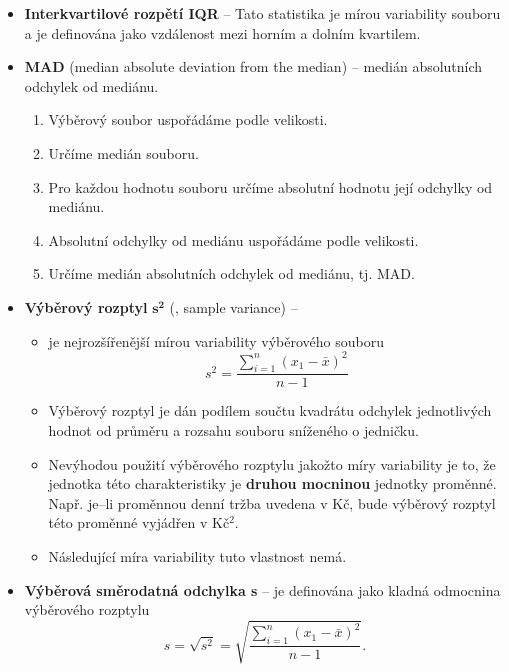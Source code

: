 \begin{itemize}
    \item \textbf{Interkvartilové rozpětí IQR} -- Tato statistika je mírou variability souboru a je definována jako vzdálenost mezi horním a dolním kvartilem.
    \item \textbf{MAD} (median absolute deviation from the median) -- medián absolutních odchylek od mediánu.
          \begin{enumerate}
              \item Výběrový soubor uspořádáme podle velikosti.
              \item Určíme medián souboru.
              \item Pro každou hodnotu souboru určíme absolutní hodnotu její odchylky od mediánu.
              \item Absolutní odchylky od mediánu uspořádáme podle velikosti.
              \item Určíme medián absolutních odchylek od mediánu, tj. MAD.
          \end{enumerate}
    \item \textbf{Výběrový rozptyl} $\mathbf{s^2}$ (, sample variance) --
          \begin{itemize}
              \item  je nejrozšířenější mírou variability výběrového souboru
                    \begin{equation*}
                        s^2 = \frac{\sum\limits_{i=1}^n (x_1 - \bar{x})^2} {n - 1}
                    \end{equation*}
              \item Výběrový rozptyl je dán podílem součtu kvadrátu odchylek jednotlivých hodnot od průměru a rozsahu souboru sníženého o jedničku.
              \item Nevýhodou použití výběrového rozptylu jakožto míry variability je to, že jednotka této charakteristiky je \textbf{druhou mocninou} jednotky proměnné. Např. je--li proměnnou denní tržba uvedena v Kč, bude výběrový rozptyl této proměnné vyjádřen v Kč$^2$.
              \item Následující míra variability tuto vlastnost nemá.
          \end{itemize}
    \item \textbf{Výběrová směrodatná odchylka s} -- je definována jako kladná odmocnina výběrového rozptylu
          \begin{equation*}
              s = \sqrt{s^2} = \sqrt{\frac{\sum\limits_{i=1}^n (x_1 - \bar{x})^2} {n - 1}}.
          \end{equation*}

\end{itemize}
